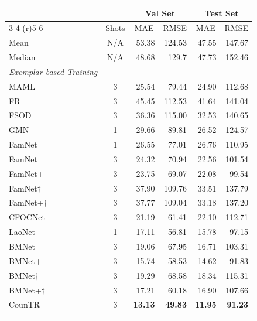 
\begin{tabular}{lcrrrr}
 \toprule
 & &\multicolumn{2}{c}{Val Set} & \multicolumn{2}{c}{Test Set} \\
 \cmidrule(r){3-4} \cmidrule(r){5-6}
\multicolumn{1}{c}{Method} & \multicolumn{1}{c}{Shots} &\multicolumn{1}{c}{MAE} & \multicolumn{1}{c}{RMSE} & \multicolumn{1}{c}{MAE} & \multicolumn{1}{c}{RMSE} \\

\midrule
Mean & N/A & 53.38 & 124.53 & 47.55 & 147.67 \\
Median & N/A  & 48.68 & 129.7 & 47.73 & 152.46 \\
\midrule
\textit{Exemplar-based Training} & & & & \\
MAML 
\cite{finn2017model}
& 3 & 25.54 & 79.44 & 24.90 & 112.68 \\
FR 
\cite{kang2019few} & 3
& 45.45 & 112.53 & 41.64 & 141.04 \\
FSOD 
\cite{fan2020few} & 3
& 36.36 & 115.00 & 32.53 & 140.65 \\
GMN 
 \cite{Lu18} & 1 
& 29.66 & 89.81 & 26.52 & 124.57 \\
FamNet 
 \cite{ranjan2021Famnet} & 1 
& 26.55 & 77.01 & 26.76 & 110.95 \\
FamNet 
 \cite{ranjan2021Famnet} & 3 
& 24.32 & 70.94 & 22.56 & 101.54 \\
FamNet+ 
 \cite{ranjan2021Famnet} & 3 
& 23.75 & 69.07 & 22.08 & 99.54 \\
FamNet$\dag$  \cite{ranjan2021Famnet} & 3 & 37.90 &  109.76 & 33.51  & 137.79  \\
FamNet+$\dag$  \cite{ranjan2021Famnet} & 3 & 37.77 & 109.04 &  33.18 & 137.20
 \\
CFOCNet \cite{yang2021cfoc}
& 3 
& 21.19 & 61.41 & 22.10 & 112.71  \\
LaoNet \cite{lin2021object}
& 1 
& 17.11 & 56.81 & 15.78 & 97.15 \\
BMNet 
  \cite{shi2022represent} & 3 
& 19.06 & 67.95 & 16.71 & 103.31  \\
BMNet+  \cite{shi2022represent} & 3 
& 15.74 & 58.53 & 14.62 & 91.83 \\
BMNet$\dag$ 
 \cite{shi2022represent} & 3 
& 19.29  & 68.58 & 18.34  & 115.31  \\
BMNet+$\dag$  
 \cite{shi2022represent} & 3 
& 17.21 & 60.18 & 16.90 & 107.66  \\
\color{gray}
CounTR \cite{liu2022countr}  & 3 
 & \textbf{13.13} & \textbf{49.83} & \textbf{11.95} & \textbf{91.23} \\
 \color{gray}

\end{tabular}
